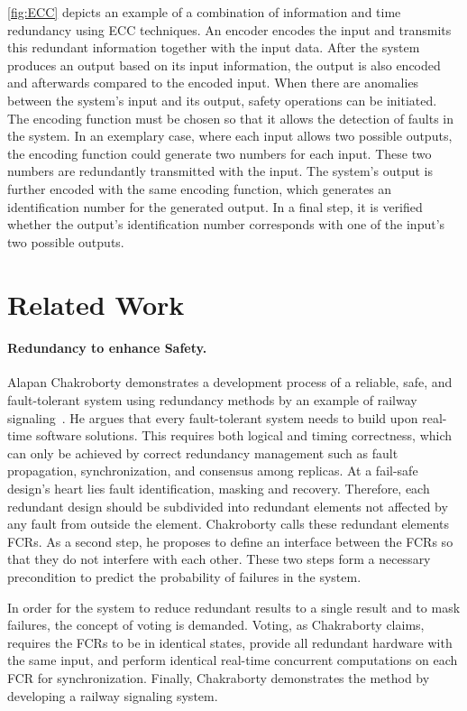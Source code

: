 \autoref{fig:ECC} depicts an example of a combination of information and time redundancy using \gls*{ECC} techniques.
An encoder encodes the input and transmits this redundant information together with the input data.
After the system produces an output based on its input information, the output is also encoded and afterwards compared to the encoded input.
When there are anomalies between the system's input and its output, safety operations can be initiated.
The encoding function must be chosen so that it allows the detection of faults in the system.
In an exemplary case, where each input allows two possible outputs, the encoding function could generate two numbers for each input.
These two numbers are redundantly transmitted with the input.
The system's output is further encoded with the same encoding function, which generates an identification number for the generated output.
In a final step, it is verified whether the output's identification number corresponds with one of the input's two possible outputs.

\section{Related Work}
\paragraph{Redundancy to enhance Safety.}
Alapan Chakroborty demonstrates a development process of a reliable, safe, and fault-tolerant system using redundancy methods by an example of railway signaling~\cite{ChakrabortyFaultTolerantRailway}.
He argues that every fault-tolerant system needs to build upon real-time software solutions.
This requires both logical and timing correctness, which can only be achieved by correct redundancy management such as fault propagation, synchronization, and consensus among replicas.
At a fail-safe design's heart lies fault identification, masking and recovery.
Therefore, each redundant design should be subdivided into redundant elements not affected by any fault from outside the element.
Chakroborty calls these redundant elements \glspl*{FCR}.
As a second step, he proposes to define an interface between the \glspl*{FCR} so that they do not interfere with each other.
These two steps form a necessary precondition to predict the probability of failures in the system.

In order for the system to reduce redundant results to a single result and to mask failures, the concept of voting is demanded.
Voting, as Chakraborty claims, requires the \glspl*{FCR} to be in identical states, provide all redundant hardware with the same input, and perform identical real-time concurrent computations on each \gls*{FCR} for synchronization.
Finally, Chakraborty demonstrates the method by developing a railway signaling system.
\\

